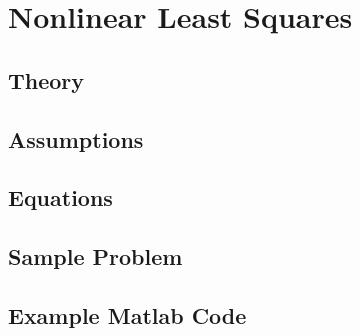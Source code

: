 \section{Nonlinear Least Squares}
\subsection{Theory}
\subsection{Assumptions}
\subsection{Equations}
\subsection{Sample Problem}
\subsection{Example Matlab Code}
